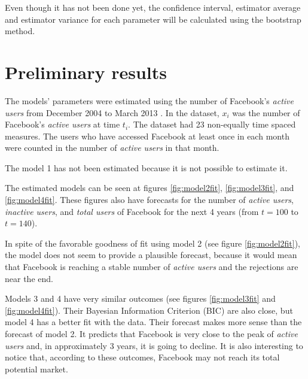 Even though it has not been done yet, the confidence interval, estimator average and estimator variance for each parameter will be calculated using the bootstrap method.



\chapter{Preliminary results}

The models' parameters were estimated using the number of Facebook's \textit{active users} from December 2004 to March 2013 \citep{facebookdata}. In the dataset, $x_i$ was the number of Facebook's \textit{active users} at time $t_i$. The dataset had 23 non-equally time spaced measures. The users who have accessed Facebook at least once in each month were counted in the number of \textit{active users} in that month.

The model 1 has not been estimated because it is not possible to estimate it.


The estimated models can be seen at figures \ref{fig:model2fit}, \ref{fig:model3fit}, and \ref{fig:model4fit}. These figures also have forecasts for the number of \textit{active users}, \textit{inactive users}, and \textit{total users} of Facebook for the next 4 years (from $t=100$ to $t=140$).

In spite of the favorable goodness of fit using model 2 (see figure \ref{fig:model2fit}), the model does not seem to provide a plausible forecast, because it would mean that Facebook is reaching a stable number of \textit{active users} and the rejections are near the end.

Models 3 and 4 have very similar outcomes (see figures \ref{fig:model3fit} and \ref{fig:model4fit}). Their Bayesian Information Criterion (BIC) are also close, but model 4 has a better fit with the data. Their forecast makes more sense than the forecast of model 2. It predicts that Facebook is very close to the peak of \textit{active users} and, in approximately 3 years, it is going to decline. It is also interesting to notice that, according to these outcomes, Facebook may not reach its total potential market.

